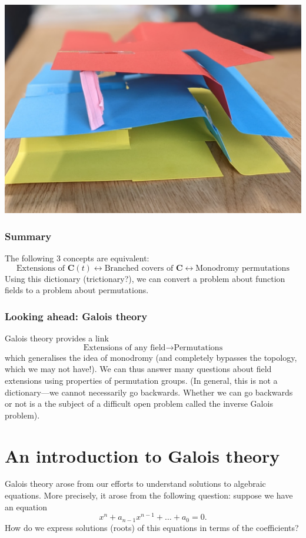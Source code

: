 \documentclass[11pt]{article}
\begin{document}
\begin{center}
\includegraphics[width=.9\linewidth]{assets/Course_notes/2023-03-28_15-29-34_screenshot.png}
\end{center}
\subsubsection{Summary}
\label{sec:org43c3004}
The following 3 concepts are equivalent:
\[
\text{Extensions of \(\mathbf{C}(t)\)} \leftrightarrow
\text{Branched covers of \(\mathbf{C}\)} \leftrightarrow
\text{Monodromy permutations}
\]
Using this dictionary (trictionary?), we can convert a problem about function fields to a problem about permutations.
\subsubsection{Looking ahead: Galois theory}
\label{sec:org62bc357}
Galois theory provides a link
\[
\text{Extensions of any field} \rightarrow
\text{Permutations}
\]
which generalises the idea of monodromy (and completely bypasses the topology, which we may not have!).
We can thus answer many questions about field extensions using properties of permutation groups.
(In general, this is not a dictionary---we cannot necessarily go backwards.  Whether we can go backwards or not is a the subject of a difficult open problem called the inverse Galois problem).
\section{An introduction to Galois theory}
\label{sec:org8fbb976}
Galois theory arose from our efforts to understand solutions to algebraic equations.
More precisely, it arose from the following question: suppose we have an equation
\[ x^{n} + a_{n-1} x^{n-1} + \dots + a_{0} = 0.\]
How do we express solutions (roots) of this equations in terms of the coefficients?
\end{document}
